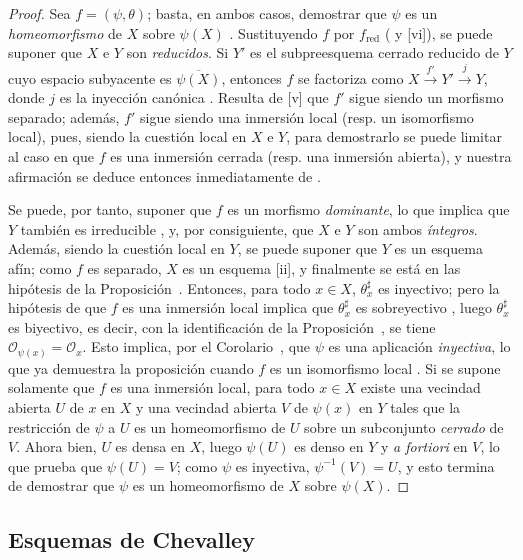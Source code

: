\documentclass[oneside]{amsart}
\theoremstyle{ega-env-style}
\theoremstyle{ega-thm-env-style}
\theoremstyle{ega-defn-env-style}
\newcommand{\oldpage}[2][]{{\marginnote{\normalfont{\textbf{#1}~|~#2}}}\ignorespaces}
\let\EGAOriginalLabel\label
\renewcommand{\label}[1]{\phantomsection\EGAOriginalLabel{#1}}
\begin{document}
\begin{proof}
Sea $f=(\psi,\theta)$;
basta, en ambos casos, demostrar que $\psi$ es un \emph{homeomorfismo} de $X$ sobre $\psi(X)$ .
Sustituyendo $f$ por $f_{\mathrm{red}}$ ( y [vi]), se puede suponer que $X$ e $Y$ son \emph{reducidos}.
Si $Y'$ es el subpreesquema cerrado reducido de $Y$ cuyo espacio subyacente es $\overline{\psi(X)}$, entonces $f$ se factoriza como $X\xrightarrow{f'}Y'\xrightarrow{j}Y$, donde $j$ es la inyección canónica .
Resulta de [v] que $f'$ sigue siendo un morfismo separado; además, $f'$ sigue siendo
\oldpage[I]{168}
una inmersión local (resp. un isomorfismo local), pues, siendo la cuestión local en $X$ e $Y$, para demostrarlo se puede limitar al caso en que $f$ es una inmersión cerrada (resp. una inmersión abierta), y nuestra afirmación se deduce entonces inmediatamente de .

Se puede, por tanto, suponer que $f$ es un morfismo \emph{dominante}, lo que implica que $Y$ también es irreducible , y, por consiguiente, que $X$ e $Y$ son ambos \emph{íntegros}.
Además, siendo la cuestión local en $Y$, se puede suponer que $Y$ es un esquema afín;
como $f$ es separado, $X$ es un esquema [ii], y finalmente se está en las hipótesis de la Proposición~.
Entonces, para todo $x\in X$, $\theta_x^\sharp$ es inyectivo;
pero la hipótesis de que $f$ es una inmersión local implica que $\theta_x^\sharp$ es sobreyectivo , luego $\theta_x^\sharp$ es biyectivo, es decir, con la identificación de la Proposición~, se tiene $\mathscr{O}_{\psi(x)}=\mathscr{O}_x$.
Esto implica, por el Corolario~, que $\psi$ es una aplicación \emph{inyectiva}, lo que ya demuestra la proposición cuando $f$ es un isomorfismo local .
Si se supone solamente que $f$ es una inmersión local, para todo $x\in X$ existe una vecindad abierta $U$ de $x$ en $X$ y una vecindad abierta $V$ de $\psi(x)$ en $Y$ tales que la restricción de $\psi$ a $U$ es un homeomorfismo de $U$ sobre un subconjunto \emph{cerrado} de $V$.
Ahora bien, $U$ es densa en $X$, luego $\psi(U)$ es denso en $Y$ y \emph{a fortiori} en $V$, lo que prueba que $\psi(U)=V$;
como $\psi$ es inyectiva, $\psi^{-1}(V)=U$, y esto termina de demostrar que $\psi$ es un homeomorfismo de $X$ sobre $\psi(X)$.
\end{proof}

\subsection{Esquemas de Chevalley}
\label{subsection:I.8.3}
\end{document}
